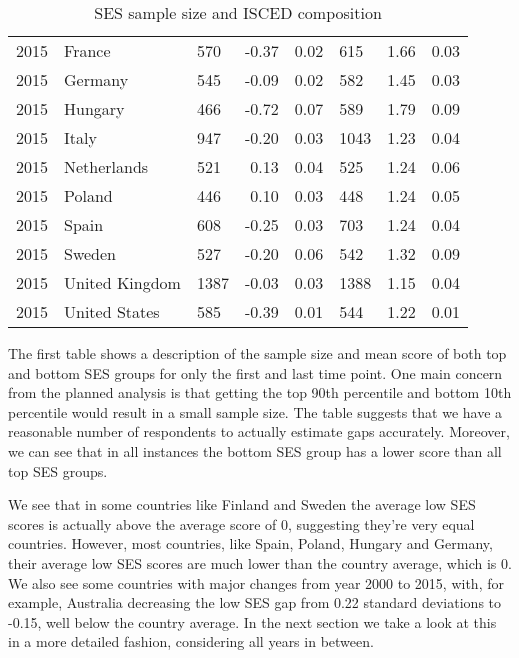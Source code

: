 \documentclass[11pt, a4paper]{article}\usepackage[]{graphicx}\usepackage[]{color}
\begin{document}
\begin{table}[ht]
\begin{tabular}{lllrrlrr}
  2015 & France & 570 & -0.37 & 0.02 & 615 & 1.66 & 0.03 \\ 
  2015 & Germany & 545 & -0.09 & 0.02 & 582 & 1.45 & 0.03 \\ 
  2015 & Hungary & 466 & -0.72 & 0.07 & 589 & 1.79 & 0.09 \\ 
  2015 & Italy & 947 & -0.20 & 0.03 & 1043 & 1.23 & 0.04 \\ 
  2015 & Netherlands & 521 & 0.13 & 0.04 & 525 & 1.24 & 0.06 \\ 
  2015 & Poland & 446 & 0.10 & 0.03 & 448 & 1.24 & 0.05 \\ 
  2015 & Spain & 608 & -0.25 & 0.03 & 703 & 1.24 & 0.04 \\ 
  2015 & Sweden & 527 & -0.20 & 0.06 & 542 & 1.32 & 0.09 \\ 
  2015 & United Kingdom & 1387 & -0.03 & 0.03 & 1388 & 1.15 & 0.04 \\ 
  2015 & United States & 585 & -0.39 & 0.01 & 544 & 1.22 & 0.01 \\ 
   \hline
\end{tabular}
\caption{SES sample size and ISCED composition} 
\end{table}


The first table shows a description of the sample size and mean score of both top and bottom SES groups for only the first and last time point. One main concern from the planned analysis is that getting the top 90th percentile and bottom 10th percentile would result in a small sample size. The table suggests that we have a reasonable number of respondents to actually estimate gaps accurately. Moreover, we can see that in all instances the bottom SES group has a lower score than all top SES groups.

We see that in some countries like Finland and Sweden the average low SES scores is actually above the average score of 0, suggesting they're very equal countries. However, most countries, like Spain, Poland, Hungary and Germany, their average low SES scores are much lower than the country average, which is 0. We also see some countries with major changes from year 2000 to 2015, with, for example, Australia decreasing the low SES gap from 0.22 standard deviations to -0.15, well below the country average. In the next section we take a look at this in a more detailed fashion, considering all years in between.





\end{document}
